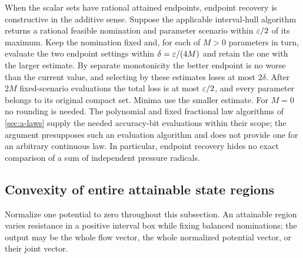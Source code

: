 When the scalar sets have rational attained endpoints, endpoint recovery
is constructive in the additive sense. Suppose the applicable
interval-hull algorithm returns a rational feasible nomination and
parameter scenario within $\varepsilon/2$ of its maximum. Keep the nomination
fixed and, for each of $M>0$ parameters in turn, evaluate the two
endpoint settings within $\delta=\varepsilon/(4M)$ and retain the one with the
larger estimate. By separate monotonicity the better endpoint is no worse
than the current value, and selecting by these estimates loses at most
$2\delta$. After $2M$ fixed-scenario evaluations the total loss is at
most $\varepsilon/2$, and every parameter belongs to its original compact set.
Minima use the smaller estimate. For $M=0$ no rounding is needed. The
polynomial and fixed fractional law algorithms of \cref{sec:a-laws}
supply the needed accuracy-bit evaluations within their scope; the
argument presupposes such an evaluation algorithm and does not provide
one for an arbitrary continuous law. In particular, endpoint recovery
hides no exact comparison of a sum of independent pressure radicals.

\subsection{Convexity of entire attainable state regions}

Normalize one potential to zero throughout this subsection. An attainable
region varies resistance in a positive interval box while fixing balanced
nominations; the output may be the whole flow vector, the whole normalized
potential vector, or their joint vector.

